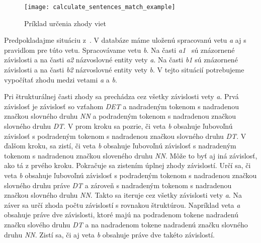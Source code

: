 \begin{figure}[H]
	\begin{center}\texttt{[image: calculate\_sentences\_match\_example]}\end{center}
	\caption[Príklad určenia zhody viet]{Príklad určenia zhody viet}\label{fig:calculate_match_sentences_example}
\end{figure}

Predpokladajme situáciu z~. V databáze máme uloženú spracovanú vetu \textit{a} aj s pravidlom pre túto vetu. Spracovávame vetu \textit{b}. Na časti \textit{a1}~ sú znázornené závislosti a na časti \textit{a2} názvoslovné entity vety \textit{a}. Na časti \textit{b1} sú znázornené závislosti a na časti \textit{b2} názvoslovné entity vety \textit{b}. V tejto situácií potrebujeme vypočítať zhodu medzi vetami \textit{a} a \textit{b}. 

Pri štrukturálnej časti zhody sa prechádza cez všetky závislosti vety \textit{a}. Prvá závislosť je závislosť so vzťahom \textit{DET} a nadradeným tokenom s nadradenou značkou slovného druhu \textit{NN} a podradeným tokenom s nadradenou značkou slovného druhu \textit{DT}. V prom kroku sa pozrie, či veta \textit{b} obsahuje ľubovoľnú závislosť s podradeným tokenom s nadradenou značkou slovného druhu \textit{DT}. V ďalšom kroku, sa zistí, či veta \textit{b} obsahuje ľubovoľnú závislosť s nadradeným tokenom s nadradenou značkou sloveného druhu \textit{NN}. Môže to byť aj iná závislosť, ako tá z prvého kroku. Pokračuje sa zistením úplnej zhody závislostí. Určí sa, či veta \textit{b} obsahuje ľubovoľnú závislosť s podradeným tokenom s nadradenou značkou slovného druhu práve \textit{DT} a zároveň s nadradeným tokenom s nadradenou značkou slovného druhu \textit{NN}. Takto sa iteruje cez všetky závislosti vety \textit{a}. Na záver sa určí zhoda počtu závislostí s rovnakou štruktúrou. Napríklad veta \textit{a} obsahuje práve dve závislosti, ktoré majú na podradenom tokene nadradenú značku slového druhu \textit{DT} a na nadradenom tokene nadradenú značku slovného druhu \textit{NN}. Zistí sa, či aj veta \textit{b} obsahuje práve dve takéto závislostí. \\

